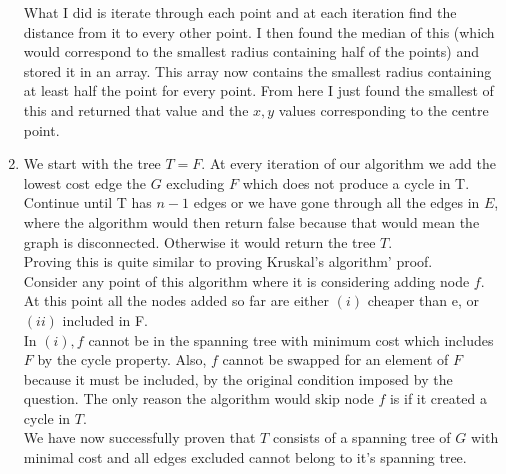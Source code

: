 \begin{enumerate}[1.]
What I did is iterate through each point and at each iteration find the distance from it to every other point. I then found the median of this (which would correspond to the smallest radius containing half of the points) and stored it in an array. This array now contains the smallest radius containing at least half the point for every point. From here I just found the smallest of this and returned that value and the $x, y$ values corresponding to the centre point. 

\item
We start with the tree $T=F$. At every iteration of our algorithm we add the lowest cost edge the $G$ excluding $F$ which does not produce a cycle in T. Continue until T has $n-1$ edges or we have gone through all the edges in $E$, where the algorithm would then return false because that would mean the graph is disconnected. Otherwise it would return the tree $T$. \\
Proving this is quite similar to proving Kruskal's algorithm' proof.\\ Consider any point of this algorithm where it is considering adding node $f$. At this point all the nodes added so far are either $(i)$ cheaper than e, or $(ii)$ included in F.\\
In $(i), f$ cannot be in the spanning tree with minimum cost which includes $F$ by the cycle property.  Also, $f$ cannot be swapped for an element of $F$ because it must be included, by the original condition imposed by the question. The only reason the algorithm would skip node $f$ is if it created a cycle in $T$.\\We have now successfully proven that $T$ consists of a spanning tree of $G$ with minimal cost and all edges excluded cannot belong to it's spanning tree. 
\end{enumerate}
